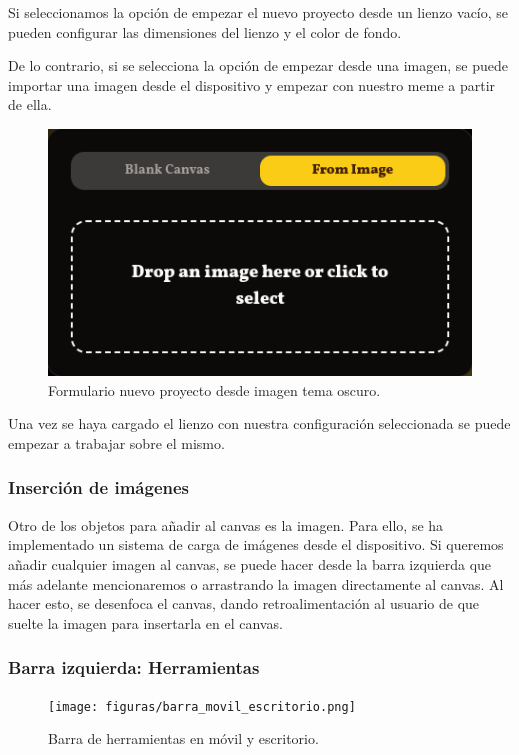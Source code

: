 Si seleccionamos la opción de empezar el nuevo proyecto desde un lienzo vacío, se pueden configurar las dimensiones del lienzo y el color de fondo.

De lo contrario, si se selecciona la opción de empezar desde una imagen, se puede importar una imagen desde el dispositivo y empezar con nuestro meme a partir de ella.

\begin{figure}[H]
    \caption{Formulario nuevo proyecto desde imagen tema oscuro.}
    \centering
    \vspace*{0.5cm}
    \includegraphics[scale=0.5]{figuras/meme_imagen_oscuro.png}
\end{figure}

Una vez se haya cargado el lienzo con nuestra configuración seleccionada se puede empezar a trabajar sobre el mismo.

\subsubsection{Inserción de imágenes}

Otro de los objetos para añadir al canvas es la imagen. Para ello, se ha implementado un sistema de carga de imágenes desde el dispositivo. Si queremos añadir cualquier imagen al canvas, se puede hacer desde la barra izquierda que más adelante mencionaremos o arrastrando la imagen directamente al canvas. Al hacer esto, se desenfoca el canvas, dando retroalimentación al usuario de que suelte la imagen para insertarla en el canvas.

\subsubsection{Barra izquierda: Herramientas}

\begin{figure}[H]
    \caption{Barra de herramientas en móvil y escritorio.}
    \centering
    \vspace*{0.5cm}
    \texttt{[image: figuras/barra\_movil\_escritorio.png]}
\end{figure}

